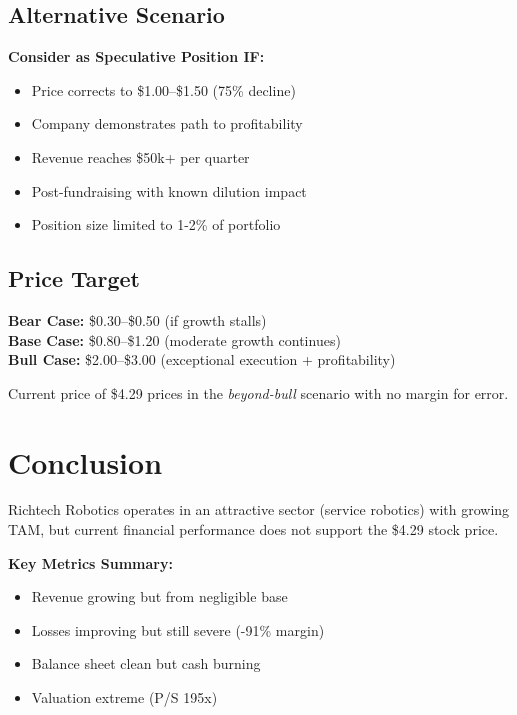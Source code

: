 \documentclass[11pt,a4paper]{article}
\begin{document}
\subsection{Alternative Scenario}

\textbf{Consider as Speculative Position IF:}
\begin{itemize}[itemsep=3pt]
    \item Price corrects to \$1.00--\$1.50 (75\% decline)
    \item Company demonstrates path to profitability
    \item Revenue reaches \$50k+ per quarter
    \item Post-fundraising with known dilution impact
    \item Position size limited to 1-2\% of portfolio
\end{itemize}

\subsection{Price Target}

\textbf{Bear Case:} \$0.30--\$0.50 (if growth stalls)\\
\textbf{Base Case:} \$0.80--\$1.20 (moderate growth continues)\\
\textbf{Bull Case:} \$2.00--\$3.00 (exceptional execution + profitability)

Current price of \$4.29 prices in the \textit{beyond-bull} scenario with no margin for error.

\section{Conclusion}

Richtech Robotics operates in an attractive sector (service robotics) with growing TAM, but current financial performance does not support the \$4.29 stock price. 

\textbf{Key Metrics Summary:}
\begin{itemize}[itemsep=1pt]
    \item Revenue growing but from negligible base
    \item Losses improving but still severe (-91\% margin)
    \item Balance sheet clean but cash burning
    \item Valuation extreme (P/S 195x)
\end{itemize}

\vspace{0.5cm}
\end{document}

